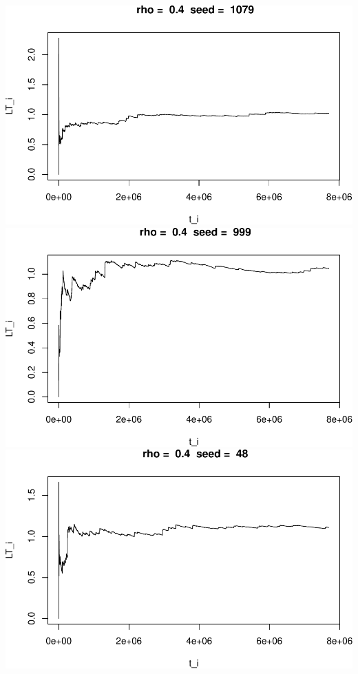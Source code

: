 \documentclass[]{article}
\begin{document}
\includegraphics{003_files/figure-latex/unnamed-chunk-15-4.pdf}
\includegraphics{003_files/figure-latex/unnamed-chunk-15-5.pdf}
\includegraphics{003_files/figure-latex/unnamed-chunk-15-6.pdf}
\end{document}
